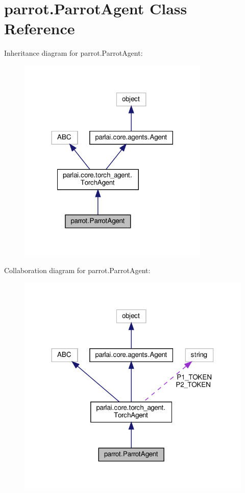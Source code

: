 \hypertarget{classparrot_1_1ParrotAgent}{}\section{parrot.\+Parrot\+Agent Class Reference}
\label{classparrot_1_1ParrotAgent}


Inheritance diagram for parrot.\+Parrot\+Agent\+:
\nopagebreak
\begin{figure}[H]
\begin{center}
\leavevmode
\includegraphics[width=258pt]{d0/d39/classparrot_1_1ParrotAgent__inherit__graph}
\end{center}
\end{figure}


Collaboration diagram for parrot.\+Parrot\+Agent\+:
\nopagebreak
\begin{figure}[H]
\begin{center}
\leavevmode
\includegraphics[width=318pt]{d6/de4/classparrot_1_1ParrotAgent__coll__graph}
\end{center}
\end{figure}
